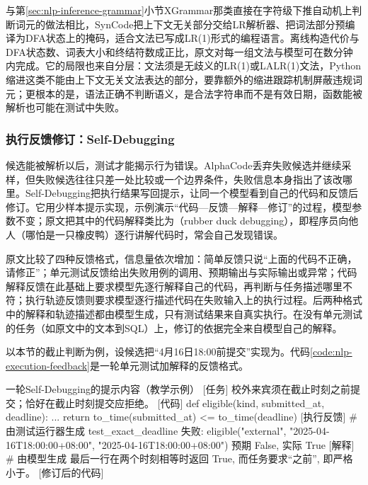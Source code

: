 与第\ref{sec:nlp-inference-grammar}小节XGrammar那类直接在字符级下推自动机上判断词元的做法相比，SynCode把上下文无关部分交给LR解析器、把词法部分预编译为DFA状态上的掩码，适合文法已写成LR(1)形式的编程语言。离线构造代价与DFA状态数、词表大小和终结符数成正比，原文对每一组文法与模型可在数分钟内完成。它的局限也来自分层：文法须是无歧义的LR(1)或LALR(1)文法，Python缩进这类不能由上下文无关文法表达的部分，要靠额外的缩进跟踪机制屏蔽违规词元；更根本的是，语法正确不判断语义，是合法字符串而不是有效日期，函数能被解析也可能在测试中失败。

\subsubsection{执行反馈修订：Self-Debugging}
\label{sec:nlp-execution-self-debugging}

候选能被解析以后，测试才能揭示行为错误。AlphaCode丢弃失败候选并继续采样，但失败候选往往只差一处比较或一个边界条件，失败信息本身指出了该改哪里。Self-Debugging把执行结果写回提示，让同一个模型看到自己的代码和反馈后修订。它用少样本提示实现，示例演示“代码—反馈—解释—修订”的过程，模型参数不变；原文把其中的代码解释类比为（rubber duck debugging），即程序员向他人（哪怕是一只橡皮鸭）逐行讲解代码时，常会自己发现错误。

原文比较了四种反馈格式，信息量依次增加：简单反馈只说“上面的代码不正确，请修正”；单元测试反馈给出失败用例的调用、预期输出与实际输出或异常；代码解释反馈在此基础上要求模型先逐行解释自己的代码，再判断与任务描述哪里不符；执行轨迹反馈则要求模型逐行描述代码在失败输入上的执行过程。后两种格式中的解释和轨迹描述都由模型生成，只有测试结果来自真实执行。在没有单元测试的任务（如原文中的文本到SQL）上，修订的依据完全来自模型自己的解释。

以本节的截止判断为例，设候选把“4月16日18:00前提交”实现为\code{<=}。代码\ref{code:nlp-execution-feedback}是一轮单元测试加解释的反馈格式。

\begin{codeblock}[label={code:nlp-execution-feedback}]{一轮Self-Debugging的提示内容（教学示例）}
[任务] 校外来宾须在截止时刻之前提交；恰好在截止时刻提交应拒绝。
[代码]
def eligible(kind, submitted_at, deadline):
    ...
    return to_time(submitted_at) <= to_time(deadline)
[执行反馈]  # 由测试运行器生成
test_exact_deadline 失败:
  eligible("external", "2025-04-16T18:00:00+08:00",
           "2025-04-16T18:00:00+08:00")
  预期 False, 实际 True
[解释]  # 由模型生成
最后一行在两个时刻相等时返回 True, 而任务要求“之前”, 即严格小于。
[修订后的代码]
\end{codeblock}

